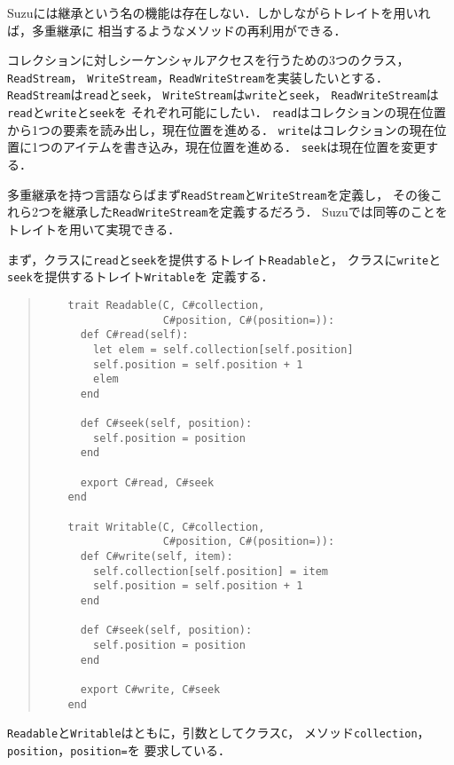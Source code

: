 \documentclass[a4paper,11pt,dvipdfmx]{jreport}
\begin{document}
Suzuには継承という名の機能は存在しない．しかしながらトレイトを用いれば，多重継承に
相当するようなメソッドの再利用ができる．

コレクションに対しシーケンシャルアクセスを行うための3つのクラス，\verb|ReadStream|，
\verb|WriteStream|，\verb|ReadWriteStream|を実装したいとする．
\verb|ReadStream|は\verb|read|と\verb|seek|，
\verb|WriteStream|は\verb|write|と\verb|seek|，
\verb|ReadWriteStream|は\verb|read|と\verb|write|と\verb|seek|を
それぞれ可能にしたい．
\verb|read|はコレクションの現在位置から1つの要素を読み出し，現在位置を進める．
\verb|write|はコレクションの現在位置に1つのアイテムを書き込み，現在位置を進める．
\verb|seek|は現在位置を変更する．

多重継承を持つ言語ならばまず\verb|ReadStream|と\verb|WriteStream|を定義し，
その後これら2つを継承した\verb|ReadWriteStream|を定義するだろう．
Suzuでは同等のことをトレイトを用いて実現できる．

まず，クラスに\verb|read|と\verb|seek|を提供するトレイト\verb|Readable|と，
クラスに\verb|write|と\verb|seek|を提供するトレイト\verb|Writable|を
定義する．
\begin{quote}
	\begin{verbatim}
	trait Readable(C, C#collection,
	               C#position, C#(position=)):
	  def C#read(self):
	    let elem = self.collection[self.position]
	    self.position = self.position + 1
	    elem
	  end
	  
	  def C#seek(self, position):
	    self.position = position
	  end
	  
	  export C#read, C#seek
	end
	
	trait Writable(C, C#collection,
	               C#position, C#(position=)):
	  def C#write(self, item):
	    self.collection[self.position] = item
	    self.position = self.position + 1
	  end
	  
	  def C#seek(self, position):
	    self.position = position
	  end
	
	  export C#write, C#seek
	end
	\end{verbatim}
\end{quote}
\verb|Readable|と\verb|Writable|はともに，引数としてクラス\verb|C|，
メソッド\verb|collection|，\verb|position|，\verb|position=|を
要求している．
\end{document}

